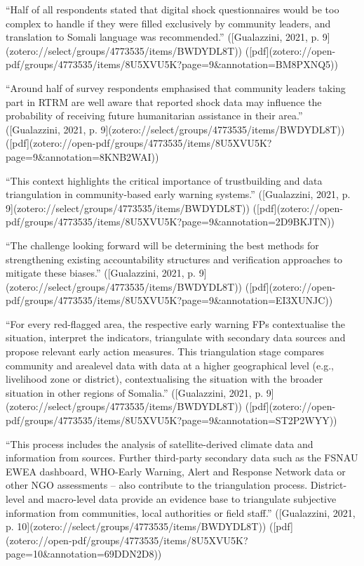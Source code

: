 {“Half of all respondents stated that digital shock questionnaires would be too complex to handle if they were filled exclusively by community leaders, and translation to Somali language was recommended.” ([Gualazzini, 2021, p. 9](zotero://select/groups/4773535/items/BWDYDL8T)) ([pdf](zotero://open-pdf/groups/4773535/items/8U5XVU5K?page=9&annotation=BM8PXNQ5))

“Around half of survey respondents emphasised that community leaders taking part in RTRM are well aware that reported shock data may influence the probability of receiving future humanitarian assistance in their area.” ([Gualazzini, 2021, p. 9](zotero://select/groups/4773535/items/BWDYDL8T)) ([pdf](zotero://open-pdf/groups/4773535/items/8U5XVU5K?page=9&annotation=8KNB2WAI))

“This context highlights the critical importance of trustbuilding and data triangulation in community-based early warning systems.” ([Gualazzini, 2021, p. 9](zotero://select/groups/4773535/items/BWDYDL8T)) ([pdf](zotero://open-pdf/groups/4773535/items/8U5XVU5K?page=9&annotation=2D9BKJTN))

“The challenge looking forward will be determining the best methods for strengthening existing accountability structures and verification approaches to mitigate these biases.” ([Gualazzini, 2021, p. 9](zotero://select/groups/4773535/items/BWDYDL8T)) ([pdf](zotero://open-pdf/groups/4773535/items/8U5XVU5K?page=9&annotation=EI3XUNJC))

“For every red-flagged area, the respective early warning FPs contextualise the situation, interpret the indicators, triangulate with secondary data sources and propose relevant early action measures. This triangulation stage compares community and arealevel data with data at a higher geographical level (e.g., livelihood zone or district), contextualising the situation with the broader situation in other regions of Somalia.” ([Gualazzini, 2021, p. 9](zotero://select/groups/4773535/items/BWDYDL8T)) ([pdf](zotero://open-pdf/groups/4773535/items/8U5XVU5K?page=9&annotation=ST2P2WYY))

“This process includes the analysis of satellite-derived climate data and information from sources. Further third-party secondary data such as the FSNAU EWEA dashboard, WHO-Early Warning, Alert and Response Network data or other NGO assessments – also contribute to the triangulation process. District-level and macro-level data provide an evidence base to triangulate subjective information from communities, local authorities or field staff.” ([Gualazzini, 2021, p. 10](zotero://select/groups/4773535/items/BWDYDL8T)) ([pdf](zotero://open-pdf/groups/4773535/items/8U5XVU5K?page=10&annotation=69DDN2D8))

}

